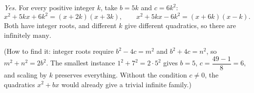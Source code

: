 \emph{Yes.} For every positive integer $k$, take $b=5k$ and $c=6k^2$:
\[x^2+5kx+6k^2=(x+2k)(x+3k),\qquad x^2+5kx-6k^2=(x+6k)(x-k).\]
Both have integer roots, and different $k$ give different quadratics, so there are $\boxed{\text{infinitely many}}$.

(How to find it: integer roots require $b^2-4c=m^2$ and $b^2+4c=n^2$, so $m^2+n^2=2b^2$. The smallest instance $1^2+7^2=2\cdot5^2$ gives $b=5$, $c=\dfrac{49-1}{8}=6$, and scaling by $k$ preserves everything. Without the condition $c\ne0$, the quadratics $x^2+bx$ would already give a trivial infinite family.)
